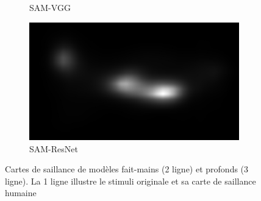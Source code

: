 \begin{figure}[ht]
\begin{subfigure}{0.24\textwidth}
        \caption{SAM-VGG}
    \end{subfigure}
    \begin{subfigure}{0.24\textwidth}
        \includegraphics[width=\linewidth]{datas/predictions/sam_resnet_cows_at_a_pond_Bilders_1856.jpg}
        \caption{SAM-ResNet}
    \end{subfigure}
     
    \caption{Cartes de saillance de modèles fait-mains (2 ligne) et profonds (3 ligne). La 1 ligne illustre le stimuli originale et sa carte de saillance humaine}
    \label{fig:saliencyModel}
\end{figure}

\vfill

